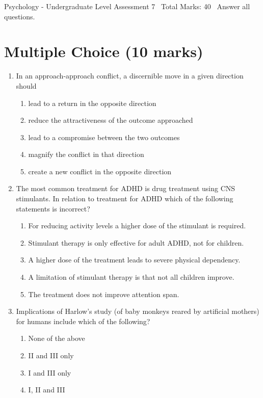\documentclass[12pt]{article}
\begin{document}
\begin{center}
Psychology - Undergraduate Level Assessment 7 \
Total Marks: 40 \
Answer all questions.
\end{center}

\section*{Multiple Choice (10 marks)}
\begin{enumerate}[label=\arabic*.]
\item In an approach-approach conflict, a discernible move in a given direction should
\begin{enumerate}[label=(\alph*)]
    \item lead to a return in the opposite direction
    \item reduce the attractiveness of the outcome approached
    \item lead to a compromise between the two outcomes
    \item magnify the conflict in that direction
    \item create a new conflict in the opposite direction
\end{enumerate}
\item The most common treatment for ADHD is drug treatment using CNS stimulants. In relation to treatment for ADHD which of the following statements is incorrect?
\begin{enumerate}[label=(\alph*)]
    \item For reducing activity levels a higher dose of the stimulant is required.
    \item Stimulant therapy is only effective for adult ADHD, not for children.
    \item A higher dose of the treatment leads to severe physical dependency.
    \item A limitation of stimulant therapy is that not all children improve.
    \item The treatment does not improve attention span.
\end{enumerate}
\item Implications of Harlow's study (of baby monkeys reared by artificial mothers) for humans include which of the following?
\begin{enumerate}[label=(\alph*)]
    \item None of the above
    \item II and III only
    \item I and III only
    \item I, II and III

\end{enumerate}
\end{enumerate}
\end{document}
